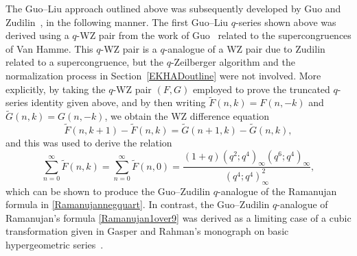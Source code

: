 \documentclass[12pt]{article}
\begin{document}
 The Guo--Liu approach outlined above was subsequently developed by Guo and Zudilin~\cite{GuoZudilin2018}, in the following manner. 
 The first Guo--Liu $q$-series shown above was derived using a $q$-WZ pair from the work of Guo~\cite{Guo2018J2} related to the 
 supercongruences of Van Hamme. This $q$-WZ pair is a $q$-analogue of a WZ pair due to Zudilin related to a 
 supercongruence, but the 
 $q$-Zeilberger algorithm and 
 the normalization process in Section~\ref{EKHADoutline} were not involved. More explicitly, by taking the 
 $q$-WZ pair $(F, G)$ employed to prove the truncated $q$-series identity given above, and by then writing $\tilde{F}(n, k) = F(n, -k)$ 
 and $\tilde{G}(n, k) = G(n, -k)$, we obtain the WZ difference equation $$ \tilde{F}(n, k+1) - \tilde{F}(n, k) = \tilde{G}(n+1, k) - \tilde{G}(n, 
 k), $$ and this was used to derive the relation 
 $$ \sum_{n=0}^{\infty} \tilde{F}(n, k) = \sum_{n=0}^{\infty} \tilde{F}(n, 0)
 = \frac{ (1 + q) (q^2;q^4)_{\infty} (q^6;q^4)_{\infty} }{ (q^4;q^4)_{\infty}^{2} }, $$ 
 which can be shown to produce the Guo--Zudilin $q$-analogue of 
 the Ramanujan formula in \eqref{Ramanujannegquart}.
 In contrast, the Guo--Zudilin $q$-analogue of 
 Ramanujan's formula \eqref{Ramanujan1over9} 
 was derived as a limiting case of a cubic transformation given in Gasper and Rahman's monograph
 on basic hypergeometric series~\cite[Equation (3.8.18)]{GasperRahman2004}. 
\end{document}
